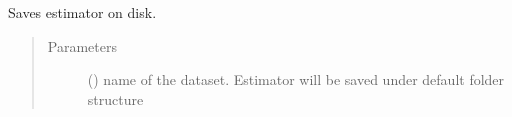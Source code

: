 \documentclass[letterpaper,10pt,english]{sphinxmanual}
\begin{document}
\begin{fulllineitems}
\begin{fulllineitems}
\label{\detokenize{estimators:mleap.estimators.glm_estimators.Passive_Aggressive_Classifier.save}}
Saves estimator on disk.
\begin{quote}\begin{description}
\item[{Parameters}] \leavevmode
{} () \textendash{} name of the dataset. Estimator will be saved under default folder structure 

\end{description}\end{quote}

\end{fulllineitems}


\end{fulllineitems}

\end{document}
